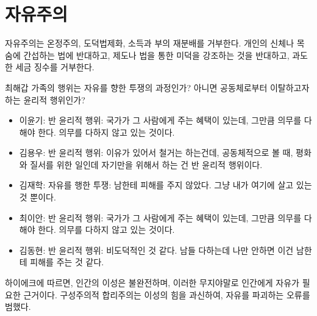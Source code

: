 \newpage
\section{자유주의}

자유주의는 온정주의, 도덕법제화, 소득과 부의 재분배를 거부한다. 개인의 신체나 목숨에 간섭하는 법에
반대하고, 제도나 법을 통한 미덕을 강조하는 것을 반대하고, 과도한 세금 징수를 거부한다.

최해갑 가족의 행위는 자유를 향한 투쟁의 과정인가? 아니면 공동체로부터 이탈하고자 하는 윤리적 행위인가?
\begin{itemize}
  \item 이윤기: 반 윤리적 행위: 국가가 그 사람에게 주는 혜택이 있는데, 그만큼
        의무를 다해야 한다. 의무를 다하지 않고 있는 것이다.
  \item 김용우: 반 윤리적 행위: 이유가 있어서 철거는 하는건데, 공동체적으로 볼
  때, 평화와 질서를 위한 일인데 자기만을 위해서 하는 건 반 윤리적 행위이다.
  \item  김재학: 자유를 행한 투쟁: 남한테 피해를 주지 않았다. 그냥 내가 여기에
  살고 있는 것 뿐이다.
  \item 최이안: 반 윤리적 행위: 국가가 그 사람에게 주는 혜택이 있는데, 그만큼
  의무를 다해야 한다. 의무를 다하지 않고 있는 것이다.
  \item 김동현: 반 윤리적 행위: 비도덕적인 것 같다. 남들 다하는데 나만 안하면
  이건 남한테 피해를 주는 것 같다.
\end{itemize}

하이에크에 따르면, 인간의 이성은 불완전하며, 이러한 무지야말로 인간에게 자유가
필요한 근거이다. 구성주의적 합리주의는 이성의 힘을 과신하여, 자유를 파괴하는
오류를 범했다. 